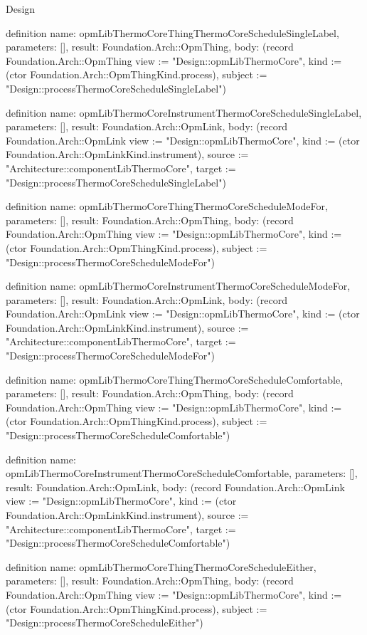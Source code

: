 \begin{lexlean}{Design}
\begin{semanticmodule}
definition{
  name: opmLibThermoCoreThingThermoCoreScheduleSingleLabel,
  parameters: [],
  result: Foundation.Arch::OpmThing,
  body: (record Foundation.Arch::OpmThing {view := "Design::opmLibThermoCore", kind := (ctor Foundation.Arch::OpmThingKind.process), subject := "Design::processThermoCoreScheduleSingleLabel"})
}

definition{
  name: opmLibThermoCoreInstrumentThermoCoreScheduleSingleLabel,
  parameters: [],
  result: Foundation.Arch::OpmLink,
  body: (record Foundation.Arch::OpmLink {view := "Design::opmLibThermoCore", kind := (ctor Foundation.Arch::OpmLinkKind.instrument), source := "Architecture::componentLibThermoCore", target := "Design::processThermoCoreScheduleSingleLabel"})
}

definition{
  name: opmLibThermoCoreThingThermoCoreScheduleModeFor,
  parameters: [],
  result: Foundation.Arch::OpmThing,
  body: (record Foundation.Arch::OpmThing {view := "Design::opmLibThermoCore", kind := (ctor Foundation.Arch::OpmThingKind.process), subject := "Design::processThermoCoreScheduleModeFor"})
}

definition{
  name: opmLibThermoCoreInstrumentThermoCoreScheduleModeFor,
  parameters: [],
  result: Foundation.Arch::OpmLink,
  body: (record Foundation.Arch::OpmLink {view := "Design::opmLibThermoCore", kind := (ctor Foundation.Arch::OpmLinkKind.instrument), source := "Architecture::componentLibThermoCore", target := "Design::processThermoCoreScheduleModeFor"})
}

definition{
  name: opmLibThermoCoreThingThermoCoreScheduleComfortable,
  parameters: [],
  result: Foundation.Arch::OpmThing,
  body: (record Foundation.Arch::OpmThing {view := "Design::opmLibThermoCore", kind := (ctor Foundation.Arch::OpmThingKind.process), subject := "Design::processThermoCoreScheduleComfortable"})
}

definition{
  name: opmLibThermoCoreInstrumentThermoCoreScheduleComfortable,
  parameters: [],
  result: Foundation.Arch::OpmLink,
  body: (record Foundation.Arch::OpmLink {view := "Design::opmLibThermoCore", kind := (ctor Foundation.Arch::OpmLinkKind.instrument), source := "Architecture::componentLibThermoCore", target := "Design::processThermoCoreScheduleComfortable"})
}

definition{
  name: opmLibThermoCoreThingThermoCoreScheduleEither,
  parameters: [],
  result: Foundation.Arch::OpmThing,
  body: (record Foundation.Arch::OpmThing {view := "Design::opmLibThermoCore", kind := (ctor Foundation.Arch::OpmThingKind.process), subject := "Design::processThermoCoreScheduleEither"})
}


\end{semanticmodule}
\end{lexlean}
